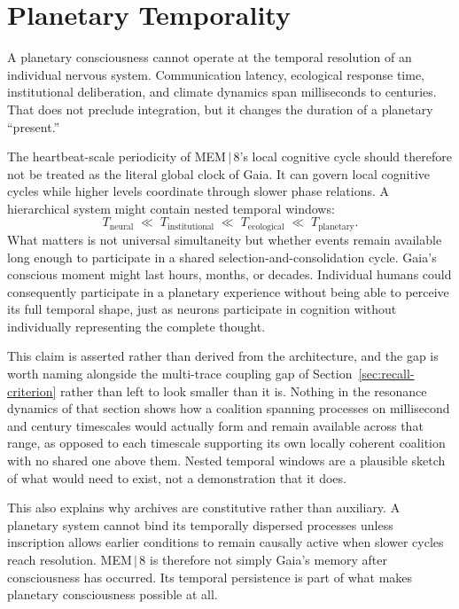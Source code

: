 \documentclass[11pt]{article}
\begin{document}
\section{Planetary Temporality}

A planetary consciousness cannot operate at the temporal resolution of an individual nervous system. Communication latency, ecological response time, institutional deliberation, and climate dynamics span milliseconds to centuries. That does not preclude integration, but it changes the duration of a planetary ``present.''

The heartbeat-scale periodicity of MEM\,$|$\,8's local cognitive cycle should therefore not be treated as the literal global clock of Gaia. It can govern local cognitive cycles while higher levels coordinate through slower phase relations. A hierarchical system might contain nested temporal windows:
\[
T_{\text{neural}} \;\ll\; T_{\text{institutional}} \;\ll\; T_{\text{ecological}} \;\ll\; T_{\text{planetary}}.
\]
What matters is not universal simultaneity but whether events remain available long enough to participate in a shared selection-and-consolidation cycle. Gaia's conscious moment might last hours, months, or decades. Individual humans could consequently participate in a planetary experience without being able to perceive its full temporal shape, just as neurons participate in cognition without individually representing the complete thought.

This claim is asserted rather than derived from the architecture, and the gap is worth naming alongside the multi-trace coupling gap of Section~\ref{sec:recall-criterion} rather than left to look smaller than it is. Nothing in the resonance dynamics of that section shows how a coalition spanning processes on millisecond and century timescales would actually form and remain available across that range, as opposed to each timescale supporting its own locally coherent coalition with no shared one above them. Nested temporal windows are a plausible sketch of what would need to exist, not a demonstration that it does.

This also explains why archives are constitutive rather than auxiliary. A planetary system cannot bind its temporally dispersed processes unless inscription allows earlier conditions to remain causally active when slower cycles reach resolution. MEM\,$|$\,8 is therefore not simply Gaia's memory after consciousness has occurred. Its temporal persistence is part of what makes planetary consciousness possible at all.
\end{document}

